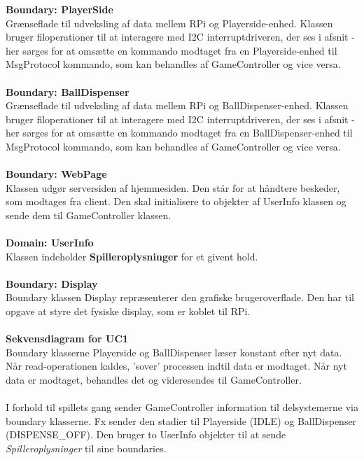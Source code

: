 \documentclass[Rapport/Rapport_main.tex]{subfiles}
\begin{document}
\textbf{Boundary:  PlayerSide}\\
Grænseflade til udveksling af data mellem RPi og Playerside-enhed. Klassen bruger filoperationer til at interagere med I2C interruptdriveren, der ses i afsnit  - her sørges for at omsætte en kommando modtaget fra en Playerside-enhed til MsgProtocol kommando, som kan behandles af GameController og vice versa.\\\\
\textbf{Boundary:  BallDispenser}\\
Grænseflade til udveksling af data mellem RPi og BallDispenser-enhed. Klassen bruger filoperationer til at interagere med I2C interruptdriveren, der ses i afsnit  - her sørges for at omsætte en kommando modtaget fra en BallDispenser-enhed til MsgProtocol kommando, som kan behandles af GameController og vice versa.\\\\
\textbf{Boundary: WebPage}\\
Klassen udgør serversiden af hjemmesiden. Den står for at håndtere beskeder, som modtages fra client. Den skal initialisere to objekter af UserInfo klassen og sende dem til GameController klassen.\\\\
\textbf{Domain: UserInfo}\\
Klassen indeholder \textbf{Spilleroplysninger} for et givent hold.\\\\
\textbf{Boundary: Display}\\
Boundary klassen Display repræsenterer den grafiske brugeroverflade. Den har til opgave at styre det fysiske display, som er koblet til RPi. \\\\
\textbf{Sekvensdiagram for UC1}\\
Boundary klasserne Playerside og BallDispenser læser konstant efter nyt data. Når read-operationen kaldes, 'sover' processen indtil data er modtaget. Når nyt data er modtaget, behandles det og videresendes til GameController. \\\\
I forhold til spillets gang sender GameController information til delsystemerne via boundary klasserne. Fx sender den stadier til Playerside (IDLE) og BallDispenser (DISPENSE\_OFF). Den bruger to UserInfo objekter til at sende \textit{Spilleroplysninger} til sine boundaries. \\\\
\end{document}
